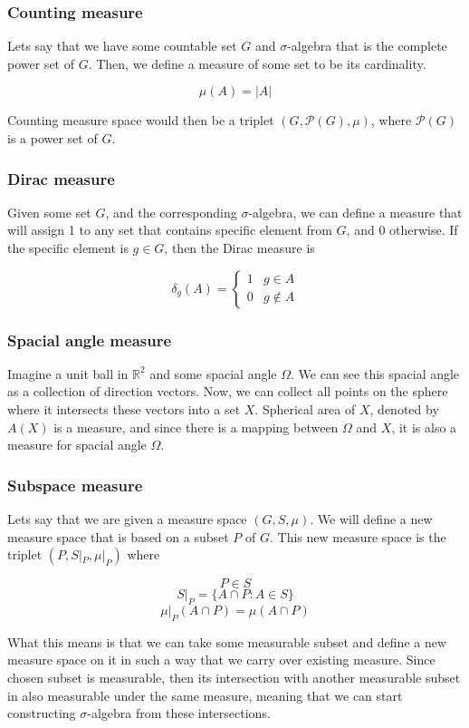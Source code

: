 \documentclass{article}
\begin{document}
\subsubsection{Counting measure}
Lets say that we have some countable set $G$ and $\sigma$-algebra that is the complete power set of $G$. Then, we define a measure of some set to be its cardinality.

\[ \mu(A)=|A| \]

Counting measure space would then be a triplet $(G,\mathcal{P}(G),\mu)$, where $\mathcal{P}(G)$ is a power set of $G$.

\subsubsection{Dirac measure}
Given some set $G$, and the corresponding $\sigma$-algebra, we can define a measure that will assign 1 to any set that contains specific element from $G$, and 0 otherwise. If the specific element is $g \in G$, then the Dirac measure is

\[ \delta_g(A)=\begin{cases}
    1 & g \in A \\
    0 & g \notin A
\end{cases} \]

\subsubsection{Spacial angle measure}
Imagine a unit ball in $\mathbb{R}^2$ and some spacial angle $\Omega$. We can see this spacial angle as a collection of direction vectors. Now, we can collect all points on the sphere where it intersects these vectors into a set $X$. Spherical area of $X$, denoted by $A(X)$ is a measure, and since there is a mapping between $\Omega$ and $X$, it is also a measure for spacial angle $\Omega$.

\subsubsection{Subspace measure}
Lets say that we are given a measure space $(G,S,\mu)$. We will define a new measure space that is based on a subset $P$ of $G$. This new measure space is the triplet $(P,S|_P,\mu|_P)$ where

\[P \in S \]
\[ S|_P=\{A \cap P: A \in S\} \]
\[ \mu|_P(A \cap P)=\mu(A \cap P) \]

What this means is that we can take some measurable subset and define a new measure space on it in such a way that we carry over existing measure. Since chosen subset is measurable, then its intersection with another measurable subset in also measurable under the same measure, meaning that we can start constructing $\sigma$-algebra from these intersections.
\end{document}
